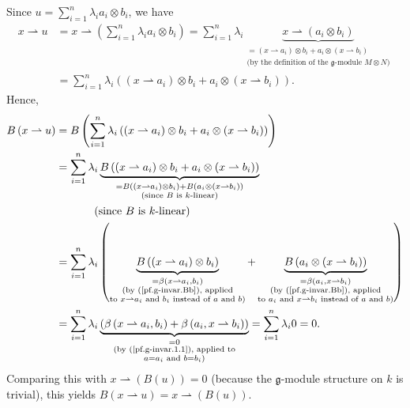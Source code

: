 \documentclass[etingof-lie.tex]{subfiles}
\begin{document}
\begin{verlong}
Since $u=\sum\limits_{i=1}^{n}\lambda_{i}a_{i}\otimes b_{i}$, we have%
\begin{align*}
x\rightharpoonup u  &  =x\rightharpoonup\left(  \sum\limits_{i=1}^{n}%
\lambda_{i}a_{i}\otimes b_{i}\right)  =\sum\limits_{i=1}^{n}\lambda
_{i}\underbrace{x\rightharpoonup\left(  a_{i}\otimes b_{i}\right)
}_{\substack{=\left(  x\rightharpoonup a_{i}\right)  \otimes b_{i}%
+a_{i}\otimes\left(  x\rightharpoonup b_{i}\right)  \\\text{(by the definition
of the }\mathfrak{g}\text{-module }M\otimes N\text{)}}}\\
&  =\sum\limits_{i=1}^{n}\lambda_{i}\left(  \left(  x\rightharpoonup
a_{i}\right)  \otimes b_{i}+a_{i}\otimes\left(  x\rightharpoonup b_{i}\right)
\right)  .
\end{align*}
Hence,%
\begin{align*}
B\left(  x\rightharpoonup u\right)   &  =B\left(  \sum\limits_{i=1}^{n}%
\lambda_{i}\left(  \left(  x\rightharpoonup a_{i}\right)  \otimes b_{i}%
+a_{i}\otimes\left(  x\rightharpoonup b_{i}\right)  \right)  \right) \\
&  =\sum\limits_{i=1}^{n}\lambda_{i}\underbrace{B\left(  \left(
x\rightharpoonup a_{i}\right)  \otimes b_{i}+a_{i}\otimes\left(
x\rightharpoonup b_{i}\right)  \right)  }_{\substack{=B\left(  \left(
x\rightharpoonup a_{i}\right)  \otimes b_{i}\right)  +B\left(  a_{i}%
\otimes\left(  x\rightharpoonup b_{i}\right)  \right)  \\\text{(since }B\text{
is }k\text{-linear)}}}\\
&  \ \ \ \ \ \ \ \ \ \ \left(  \text{since }B\text{ is }k\text{-linear}\right)
\\
&  =\sum\limits_{i=1}^{n}\lambda_{i}\left(  \underbrace{B\left(  \left(
x\rightharpoonup a_{i}\right)  \otimes b_{i}\right)  }_{\substack{=\beta
\left(  x\rightharpoonup a_{i},b_{i}\right)  \\\text{(by (\ref{pf.g-invar.Bb}%
), applied}\\\text{to }x\rightharpoonup a_{i}\text{ and }b_{i}\text{ instead
of }a\text{ and }b\text{)}}}+\underbrace{B\left(  a_{i}\otimes\left(
x\rightharpoonup b_{i}\right)  \right)  }_{\substack{=\beta\left(
a_{i},x\rightharpoonup b_{i}\right)  \\\text{(by (\ref{pf.g-invar.Bb}),
applied}\\\text{to }a_{i}\text{ and }x\rightharpoonup b_{i}\text{ instead of
}a\text{ and }b\text{)}}}\right) \\
&  =\sum\limits_{i=1}^{n}\lambda_{i}\underbrace{\left(  \beta\left(
x\rightharpoonup a_{i},b_{i}\right)  +\beta\left(  a_{i},x\rightharpoonup
b_{i}\right)  \right)  }_{\substack{=0\\\text{(by (\ref{pf.g-invar.1.1}),
applied to}\\a=a_{i}\text{ and }b=b_{i}\text{)}}}=\sum\limits_{i=1}^{n}%
\lambda_{i}0=0.
\end{align*}
Comparing this with $x\rightharpoonup\left(  B\left(  u\right)  \right)  =0$
(because the $\mathfrak{g}$-module structure on $k$ is trivial), this yields
$B\left(  x\rightharpoonup u\right)  =x\rightharpoonup\left(  B\left(
u\right)  \right)  $.


\end{verlong}
\end{document}
